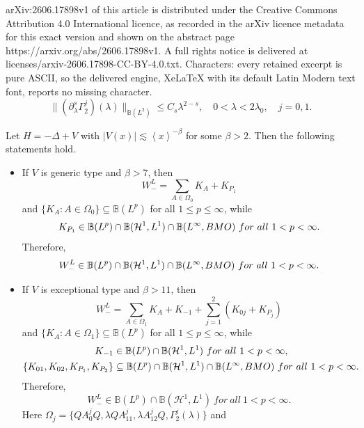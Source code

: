 \documentclass[10pt,a4paper]{amsart}
\newcommand\B{\mathbb{B}}
\newcommand\HH{\mathcal{H}}
\begin{document}
arXiv:2606.17898v1 of this article is distributed under the Creative Commons Attribution 4.0 International licence, as recorded in the arXiv licence metadata for this exact version and shown on the abstract page https://arxiv.org/abs/2606.17898v1. A full rights notice is delivered at licenses/arxiv-2606.17898-CC-BY-4.0.txt. Characters: every retained excerpt is pure ASCII, so the delivered engine, XeLaTeX with its default Latin Modern text font, reports no missing character.
\begin{equation}\label{estim of gamma}
\|(\partial^{s}_{\lambda}\Gamma^{j}_{2})(\lambda)\|_{\B(L^2)}\leq C_s\lambda^{2-s},\quad 0<\lambda<2\lambda_0,\quad j=0,1.
\end{equation}

\begin{theorem}\label{theorem of lp bounds of low energy} 
Let $H=-\Delta+V$ with $|V(x)|\lesssim \left<x\right>^{-\beta}$ for some $\beta>2$. Then the following statements hold.    \begin{itemize}
    \item [{\rm(i)}] If $V$ is generic type and $\beta>7$, then 
\begin{equation}\label{deco of regular}
W^{L}_{-}=\sum\limits_{A\in\Omega_0 }K_{A}+K_{{P_1}}
\end{equation}
and $\{K_A:A\in\Omega_0\}\subseteq\B(L^p)$ for all $1\leq p\leq\infty$, while 
$$ K_{{P_1}}\in \B(L^p)\cap\B(\HH^1,L^1)\cap\B(L^{\infty},{\rm BMO})\ for\ all\ 1<p<\infty.$$
Therefore, $$W^L_{-}\in\B(L^p)\cap\B(\HH^1,L^1)\cap\B(L^{\infty},{\rm BMO})\ for\ all\ 1<p<\infty.$$ 
\item [{\rm(ii)}] If $V$ is exceptional type and $\beta>11$, then 
\begin{equation}\label{deco of resonance}
W^{L}_{-}=\sum\limits_{A\in\Omega_1}K_A+K_{-1}+\sum\limits_{j=1}^{2}(K_{0j}+K_{{P_{j}}})   
\end{equation}
and $\{K_A:A\in\Omega_1\}\subseteq\B(L^p)$ for all $1\leq p\leq\infty$, while  
\begin{align*}
K_{-1}&\in\B(L^p)\cap\B(\HH^1,L^1)\ for\ all\ 1<p<\infty,\\
\{K_{01},K_{02},K_{{P_1}},K_{{P_2}}\}&\subseteq \B(L^p)\cap\B(\HH^1,L^1)\cap\B(L^{\infty},{\rm BMO})\ for\ all\ 1<p<\infty.
\end{align*}
Therefore,  $$W^L_{-}\in\B(L^p)\cap\B(\HH^1,L^1)\ for\ all\ 1<p<\infty.$$ 
Here $\Omega_j=\{QA^j_0Q,\lambda QA^j_{11},\lambda A^j_{12}Q, \Gamma^j_2(\lambda)\}$ and
\begin{align}\label{kernels in low energy}

\end{align}
\end{itemize}
\end{theorem}
\end{document}

